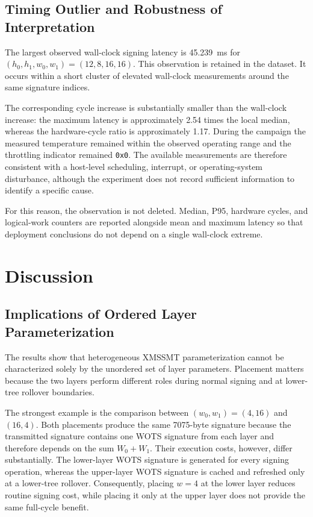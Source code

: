 \documentclass[pdflatex,sn-mathphys-num]{sn-jnl}
\begin{document}
\subsection{Timing Outlier and Robustness of Interpretation}
\label{sec:results_outlier}

The largest observed wall-clock signing latency is 45.239~ms for
$(h_0,h_1,w_0,w_1)=(12,8,16,16)$. This observation is retained in the
dataset. It occurs within a short cluster of elevated wall-clock
measurements around the same signature indices.

The corresponding cycle increase is substantially smaller than the
wall-clock increase: the maximum latency is approximately 2.54 times
the local median, whereas the hardware-cycle ratio is approximately
1.17. During the campaign the measured temperature remained within the
observed operating range and the throttling indicator remained
\texttt{0x0}. The available measurements are therefore consistent with
a host-level scheduling, interrupt, or operating-system disturbance,
although the experiment does not record sufficient information to
identify a specific cause.

For this reason, the observation is not deleted. Median, P95, hardware
cycles, and logical-work counters are reported alongside mean and
maximum latency so that deployment conclusions do not depend on a
single wall-clock extreme.

\section{Discussion}
\label{sec:discussion}

\subsection{Implications of Ordered Layer Parameterization}
\label{sec:discussion_ordering}

The results show that heterogeneous XMSSMT parameterization cannot be
characterized solely by the unordered set of layer parameters.
Placement matters because the two layers perform different roles during
normal signing and at lower-tree rollover boundaries.

The strongest example is the comparison between
$(w_0,w_1)=(4,16)$ and $(16,4)$. Both placements produce the same
7075-byte signature because the transmitted signature contains one WOTS
signature from each layer and therefore depends on the sum
$W_0+W_1$. Their execution costs, however, differ substantially.
The lower-layer WOTS signature is generated for every signing operation,
whereas the upper-layer WOTS signature is cached and refreshed only at
a lower-tree rollover. Consequently, placing $w=4$ at the lower layer
reduces routine signing cost, while placing it only at the upper layer
does not provide the same full-cycle benefit.
\end{document}
